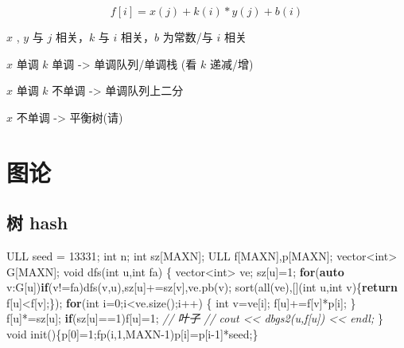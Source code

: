 \documentclass[
]{article}
\newenvironment{Shaded}{}{}
\newcommand{\CommentTok}[1]{\textcolor[rgb]{0.38,0.63,0.69}{\textit{#1}}}
\newcommand{\ControlFlowTok}[1]{\textcolor[rgb]{0.00,0.44,0.13}{\textbf{#1}}}
\newcommand{\DataTypeTok}[1]{\textcolor[rgb]{0.56,0.13,0.00}{#1}}
\newcommand{\DecValTok}[1]{\textcolor[rgb]{0.25,0.63,0.44}{#1}}
\newcommand{\KeywordTok}[1]{\textcolor[rgb]{0.00,0.44,0.13}{\textbf{#1}}}
\newcommand{\NormalTok}[1]{#1}
\begin{document}
\[ f[i] = x(j) + k(i)*y(j) + b(i) \]

\(x\) , \(y\) 与 \(j\) 相关，\(k\) 与 \(i\) 相关，\(b\) 为常数/与 \(i\)
相关

\(x\) 单调 \(k\) 单调 -\textgreater{} 单调队列/单调栈 (看 \(k\) 递减/增)

\(x\) 单调 \(k\) 不单调 -\textgreater{} 单调队列上二分

\(x\) 不单调 -\textgreater{} 平衡树(请)

\hypertarget{ux56feux8bba}{%
\section{图论}\label{ux56feux8bba}}

\hypertarget{ux6811-hash}{%
\subsection{树 hash}\label{ux6811-hash}}

\begin{Shaded}
\begin{Highlighting}[]
\NormalTok{ULL seed = }\DecValTok{13331}\NormalTok{;}
\DataTypeTok{int}\NormalTok{ n;}
\DataTypeTok{int}\NormalTok{ sz[MAXN];}
\NormalTok{ULL f[MAXN],p[MAXN];}
\NormalTok{vector\textless{}}\DataTypeTok{int}\NormalTok{\textgreater{} G[MAXN];}
\DataTypeTok{void}\NormalTok{ dfs(}\DataTypeTok{int}\NormalTok{ u,}\DataTypeTok{int}\NormalTok{ fa)}
\NormalTok{\{}
\NormalTok{    vector\textless{}}\DataTypeTok{int}\NormalTok{\textgreater{} ve; sz[u]=}\DecValTok{1}\NormalTok{;}
    \ControlFlowTok{for}\NormalTok{(}\KeywordTok{auto}\NormalTok{ v:G[u])}\ControlFlowTok{if}\NormalTok{(v!=fa)dfs(v,u),sz[u]+=sz[v],ve.pb(v);}
\NormalTok{    sort(all(ve),[](}\DataTypeTok{int}\NormalTok{ u,}\DataTypeTok{int}\NormalTok{ v)\{}\ControlFlowTok{return}\NormalTok{ f[u]\textless{}f[v];\});}
    \ControlFlowTok{for}\NormalTok{(}\DataTypeTok{int}\NormalTok{ i=}\DecValTok{0}\NormalTok{;i\textless{}ve.size();i++)}
\NormalTok{    \{}
        \DataTypeTok{int}\NormalTok{ v=ve[i];}
\NormalTok{        f[u]+=f[v]*p[i];}
\NormalTok{    \}}
\NormalTok{    f[u]*=sz[u];}
    \ControlFlowTok{if}\NormalTok{(sz[u]==}\DecValTok{1}\NormalTok{)f[u]=}\DecValTok{1}\NormalTok{; }\CommentTok{// 叶子}
    \CommentTok{// cout \textless{}\textless{} dbgs2(u,f[u]) \textless{}\textless{} endl;}
\NormalTok{\}}
\DataTypeTok{void}\NormalTok{ init()\{p[}\DecValTok{0}\NormalTok{]=}\DecValTok{1}\NormalTok{;fp(i,}\DecValTok{1}\NormalTok{,MAXN{-}}\DecValTok{1}\NormalTok{)p[i]=p[i{-}}\DecValTok{1}\NormalTok{]*seed;\}}
\end{Highlighting}
\end{Shaded}
\end{document}
